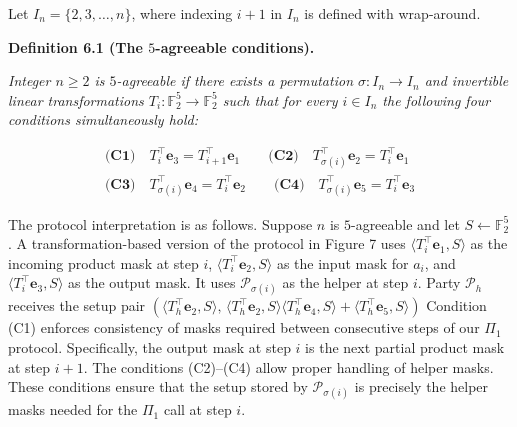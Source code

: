 Let $I_{n}=\{2,3,\ldots,n\}$, where indexing $i+1$ in $I_{n}$ is defined with wrap-around.\par





\par\medskip\noindent\textbf{
\textbf{Definition 6.1}\textbf{ }(The $5$-agreeable conditions)\textbf{.}
}\par



\emph{Integer $n\geq 2$ is $5$-agreeable if there exists a permutation $\sigma:I_{n}\to I_{n}$ and invertible linear transformations $T_{i}:\mathbb{F}_{2}^{5}\to\mathbb{F}_{2}^{5}$ such that for every $i\in I_{n}$ the following four conditions simultaneously hold:}\par


\[\begin{gathered}
\displaystyle\textbf{(C1)}\quad T_{i}^{\top}\mathbf{e}_{3}=T_{i+1}^{\top}\mathbf{e}_{1}\qquad\textbf{(C2)}\quad T_{\sigma(i)}^{\top}\mathbf{e}_{2}=T_{i}^{\top}\mathbf{e}_{1} \\
\displaystyle\textbf{(C3)}\quad T_{\sigma(i)}^{\top}\mathbf{e}_{4}=T_{i}^{\top}\mathbf{e}_{2}\qquad\textbf{(C4)}\quad T_{\sigma(i)}^{\top}\mathbf{e}_{5}=T_{i}^{\top}\mathbf{e}_{3}
\end{gathered}\]






The protocol interpretation is as follows. Suppose $n$ is $5$-agreeable and let $S\leftarrow\mathbb{F}_{2}^{5}$. A transformation-based version of the protocol in Figure 7 uses $\langle T_{i}^{\top}\mathbf{e}_{1},S\rangle$ as the incoming product mask at step $i$, $\langle T_{i}^{\top}\mathbf{e}_{2},S\rangle$ as the input mask for $a_{i}$, and $\langle T_{i}^{\top}\mathbf{e}_{3},S\rangle$ as the output mask. It uses $\mathcal{P}_{\sigma(i)}$ as the helper at step $i$. Party $\mathcal{P}_{h}$ receives the setup pair
$\left(\langle T_{h}^{\top}\mathbf{e}_{2},S\rangle,\,\langle T_{h}^{\top}\mathbf{e}_{2},S\rangle\langle T_{h}^{\top}\mathbf{e}_{4},S\rangle+\langle T_{h}^{\top}\mathbf{e}_{5},S\rangle\right)$
Condition (C1) enforces consistency of masks required between consecutive steps of our $\Pi_{1}$ protocol. Specifically, the
output mask at step $i$ is the next partial product mask at step $i+1$.
The conditions (C2)–(C4) allow proper handling of helper masks. These conditions ensure that the
setup stored by $\mathcal{P}_{\sigma(i)}$ is precisely the helper masks needed
for the $\Pi_{1}$ call at step $i$.\par




